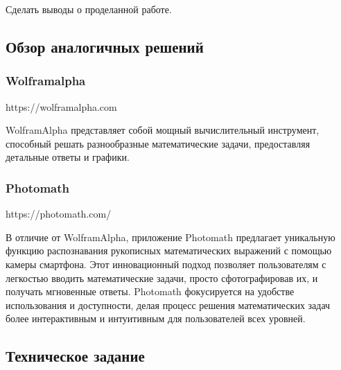 \documentclass{article}
\begin{document}
    Сделать выводы о проделанной работе.




    \subsection{Обзор аналогичных решений}



    \subsubsection{Wolframalpha} https://wolframalpha.com

    WolframAlpha представляет собой мощный вычислительный инструмент, способный решать разнообразные математические задачи, предоставляя детальные ответы и графики.
    
    \subsubsection{Photomath} https://photomath.com/

    В отличие от WolframAlpha, приложение Photomath предлагает уникальную функцию распознавания рукописных математических выражений с помощью камеры смартфона. Этот инновационный подход позволяет пользователям с легкостью вводить математические задачи, просто сфотографировав их, и получать мгновенные ответы. Photomath фокусируется на удобстве использования и доступности, делая процесс решения математических задач более интерактивным и интуитивным для пользователей всех уровней.


    \subsection{Техническое задание}
    
\end{document}
